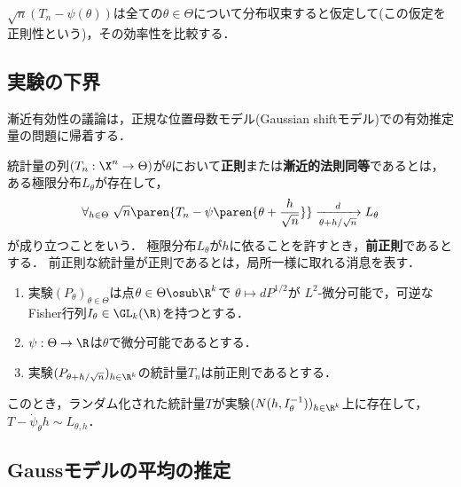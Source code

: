 \documentclass[uplatex,dvipdfmx]{jsreport}
\begin{document}
\begin{notation}
    $\sqrt{n}(T_n-\psi(\theta))$は全ての$\theta\in\Theta$について分布収束すると仮定して(この仮定を正則性という)，その効率性を比較する．
\end{notation}

\subsection{実験の下界}

\begin{tcolorbox}[colframe=ForestGreen, colback=ForestGreen!10!white,breakable,colbacktitle=ForestGreen!40!white,coltitle=black,fonttitle=\bfseries\sffamily,
title=]
    漸近有効性の議論は，正規な位置母数モデル(Gaussian shiftモデル)での有効推定量の問題に帰着する．
\end{tcolorbox}

\begin{definition}[regular]
    統計量の列$(T_n:\X^n\to\Theta)$が$\theta$において\textbf{正則}または\textbf{漸近的法則同等}であるとは，ある極限分布$L_\theta$が存在して，
    \[\forall_{h\in\Theta}\;\sqrt{n}\paren{T_n-\psi\paren{\theta+\frac{h}{\sqrt{n}}}}\xrightarrow[\theta+h/\sqrt{n}]{d}L_\theta\]
    が成り立つことをいう．
    極限分布$L_\theta$が$h$に依ることを許すとき，\textbf{前正則}であるとする．
    前正則な統計量が正則であるとは，局所一様に取れる消息を表す．
\end{definition}

\begin{theorem}\mbox{}
    \begin{enumerate}[({E}1)]
        \item 実験$(P_\theta)_{\theta\in\Theta}$は点$\theta\in\Theta\osub\R^k$で
        $\theta\mapsto dP^{1/2}$が
        $L^2$-微分可能で，可逆なFisher行列$I_\theta\in\GL_k(\R)$を持つとする．
        \item $\psi:\Theta\to\R$は$\theta$で微分可能であるとする．
        \item 実験$(P_{\theta+h/\sqrt{n}})_{h\in\R^k}$の統計量$T_n$は前正則であるとする．
    \end{enumerate}
    このとき，ランダム化された統計量$T$が実験$(N(h,I_\theta^{-1}))_{h\in\R^k}$上に存在して，$T-\dot{\psi}_\theta h\sim L_{\theta,h}$．
\end{theorem}

\subsection{Gaussモデルの平均の推定}
\end{document}
